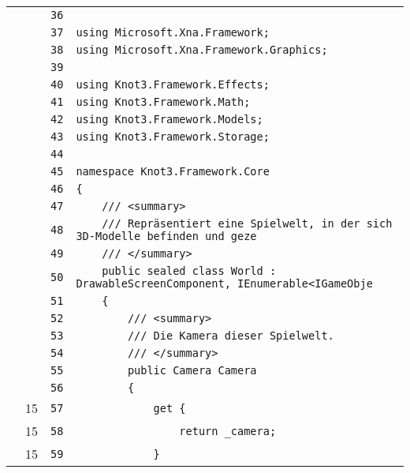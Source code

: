 \documentclass[a4paper,10pt]{article}
\begin{document}
\begin{longtable}[l]{lrrl}
\cellcolor{gray} &  & \verb~36~ & \verb~~\\
\cellcolor{gray} &  & \verb~37~ & \verb~using Microsoft.Xna.Framework;~\\
\cellcolor{gray} &  & \verb~38~ & \verb~using Microsoft.Xna.Framework.Graphics;~\\
\cellcolor{gray} &  & \verb~39~ & \verb~~\\
\cellcolor{gray} &  & \verb~40~ & \verb~using Knot3.Framework.Effects;~\\
\cellcolor{gray} &  & \verb~41~ & \verb~using Knot3.Framework.Math;~\\
\cellcolor{gray} &  & \verb~42~ & \verb~using Knot3.Framework.Models;~\\
\cellcolor{gray} &  & \verb~43~ & \verb~using Knot3.Framework.Storage;~\\
\cellcolor{gray} &  & \verb~44~ & \verb~~\\
\cellcolor{gray} &  & \verb~45~ & \verb~namespace Knot3.Framework.Core~\\
\cellcolor{gray} &  & \verb~46~ & \verb~{~\\
\cellcolor{gray} &  & \verb~47~ & \verb~    /// <summary>~\\
\cellcolor{gray} &  & \verb~48~ & \verb~    /// Repräsentiert eine Spielwelt, in der sich 3D-Modelle befinden und geze~\\
\cellcolor{gray} &  & \verb~49~ & \verb~    /// </summary>~\\
\cellcolor{gray} &  & \verb~50~ & \verb~    public sealed class World : DrawableScreenComponent, IEnumerable<IGameObje~\\
\cellcolor{gray} &  & \verb~51~ & \verb~    {~\\
\cellcolor{gray} &  & \verb~52~ & \verb~        /// <summary>~\\
\cellcolor{gray} &  & \verb~53~ & \verb~        /// Die Kamera dieser Spielwelt.~\\
\cellcolor{gray} &  & \verb~54~ & \verb~        /// </summary>~\\
\cellcolor{gray} &  & \verb~55~ & \verb~        public Camera Camera~\\
\cellcolor{gray} &  & \verb~56~ & \verb~        {~\\
\cellcolor{green} & 15 & \verb~57~ & \verb~            get {~\\
\cellcolor{green} & 15 & \verb~58~ & \verb~                return _camera;~\\
\cellcolor{green} & 15 & \verb~59~ & \verb~            }~\\

\end{longtable}
\end{document}
